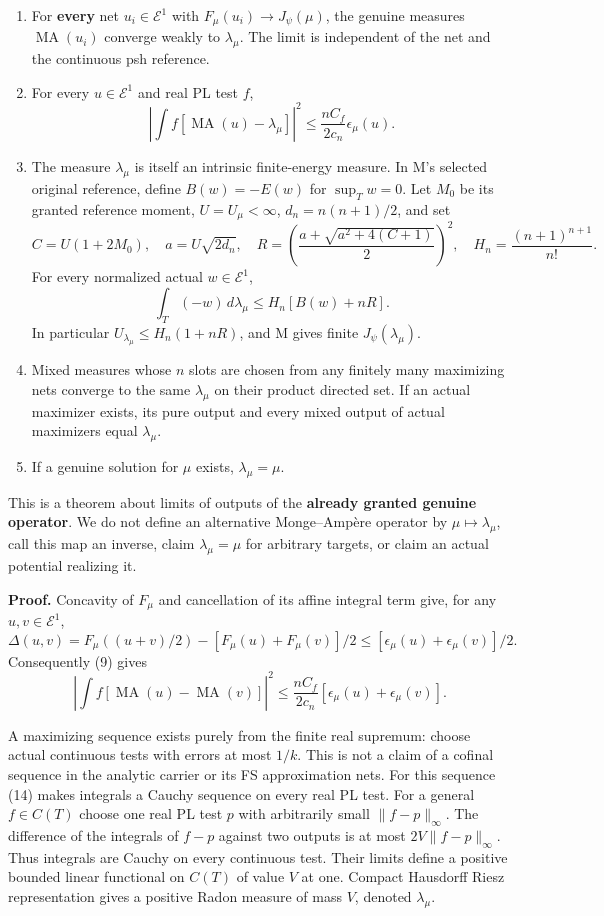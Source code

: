 \documentclass[
  11pt,
]{article}
\providecommand{\tightlist}{%
  \setlength{\itemsep}{0pt}\setlength{\parskip}{0pt}}
\begin{document}
\begin{enumerate}
\def\labelenumi{\arabic{enumi}.}
\tightlist
\item
  For \textbf{every} net \(u_i\in\mathcal E^1\) with
  \(F_\mu(u_i)\to J_\psi(\mu)\), the genuine measures
  \(\operatorname{MA}(u_i)\) converge weakly to \(\lambda_\mu\). The
  limit is independent of the net and the continuous psh reference.
\item
  For every \(u\in\mathcal E^1\) and real PL test \(f\), \[
   \left|\int f[\operatorname{MA}(u)-\lambda_\mu]\right|^2
      \leq\frac{nC_f}{2c_n}\epsilon_\mu(u).                  \tag{12}
  \]
\item
  The measure \(\lambda_\mu\) is itself an intrinsic finite-energy
  measure. In M's selected original reference, define \(B(w)=-E(w)\) for
  \(\sup_Tw=0\). Let \(M_0\) be its granted reference moment,
  \(U=U_\mu<\infty\), \(d_n=n(n+1)/2\), and set \[
   C=U(1+2M_0),\quad a=U\sqrt{2d_n},\quad
   R=\left(\frac{a+\sqrt{a^2+4(C+1)}}2\right)^2,
   \quad H_n=\frac{(n+1)^{n+1}}{n!}.
  \] For every normalized actual \(w\in\mathcal E^1\), \[
   \int_T(-w)\,d\lambda_\mu\leq H_n[B(w)+nR].                  \tag{13}
  \] In particular \(U_{\lambda_\mu}\leq H_n(1+nR)\), and M gives finite
  \(J_\psi(\lambda_\mu)\).
\item
  Mixed measures whose \(n\) slots are chosen from any finitely many
  maximizing nets converge to the same \(\lambda_\mu\) on their product
  directed set. If an actual maximizer exists, its pure output and every
  mixed output of actual maximizers equal \(\lambda_\mu\).
\item
  If a genuine solution for \(\mu\) exists, \(\lambda_\mu=\mu\).
\end{enumerate}

This is a theorem about limits of outputs of the \textbf{already granted
genuine operator}. We do not define an alternative Monge--Ampère
operator by \(\mu\mapsto\lambda_\mu\), call this map an inverse, claim
\(\lambda_\mu=\mu\) for arbitrary targets, or claim an actual potential
realizing it.

\textbf{Proof.} Concavity of \(F_\mu\) and cancellation of its affine
integral term give, for any \(u,v\in\mathcal E^1\), \[
 \Delta(u,v)=F_\mu((u+v)/2)-[F_\mu(u)+F_\mu(v)]/2
          \leq[\epsilon_\mu(u)+\epsilon_\mu(v)]/2.
\] Consequently (9) gives \[
 \left|\int f[\operatorname{MA}(u)-\operatorname{MA}(v)]\right|^2
 \leq\frac{nC_f}{2c_n}[\epsilon_\mu(u)+\epsilon_\mu(v)].       \tag{14}
\]

A maximizing sequence exists purely from the finite real supremum:
choose actual continuous tests with errors at most \(1/k\). This is not
a claim of a cofinal sequence in the analytic carrier or its FS
approximation nets. For this sequence (14) makes integrals a Cauchy
sequence on every real PL test. For a general \(f\in C(T)\) choose one
real PL test \(p\) with arbitrarily small \(\|f-p\|_\infty\). The
difference of the integrals of \(f-p\) against two outputs is at most
\(2V\|f-p\|_\infty\). Thus integrals are Cauchy on every continuous
test. Their limits define a positive bounded linear functional on
\(C(T)\) of value \(V\) at one. Compact Hausdorff Riesz representation
gives a positive Radon measure of mass \(V\), denoted \(\lambda_\mu\).
\end{document}
